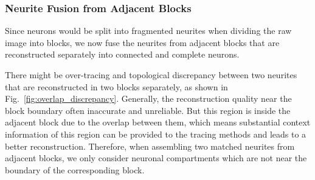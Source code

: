 \subsubsection{Neurite Fusion from Adjacent Blocks}
\label{sec:fusion}

Since neurons would be split into fragmented neurites when dividing the raw image into blocks, we now fuse the neurites from adjacent blocks that are reconstructed separately into connected and complete neurons.
 
There might be over-tracing and topological discrepancy between two neurites that are reconstructed in two blocks separately, as shown in Fig.~\ref{fig:overlap_discrepancy}.
Generally, the reconstruction quality near the block boundary often inaccurate and unreliable.
But this region is inside the adjacent block due to the overlap between them, which means substantial context information of this region can be provided to the tracing methods and leads to a better reconstruction.
%
Therefore, when assembling two matched neurites from adjacent blocks, we only consider neuronal compartments which are not near the boundary of the corresponding block. 




